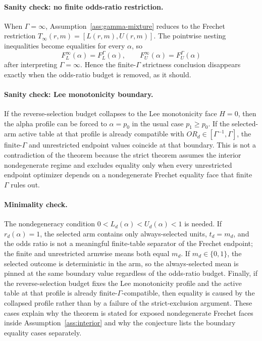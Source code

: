 \paragraph{Sanity check: no finite odds-ratio restriction.}
When \(\Gamma=\infty\), Assumption~\ref{ass:gamma-mixture} reduces to the Frechet restriction \(T_\infty(r,m)=[L(r,m),U(r,m)]\).  The pointwise nesting inequalities become equalities for every \(\alpha\), so
\[
  F_L^\infty(\alpha)=F_L^\Gamma(\alpha),
  \qquad
  F_U^\infty(\alpha)=F_U^\Gamma(\alpha)
\]
after interpreting \(\Gamma=\infty\).  Hence the finite-\(\Gamma\) strictness conclusion disappears exactly when the odds-ratio budget is removed, as it should.

\paragraph{Sanity check: Lee monotonicity boundary.}
If the reverse-selection budget collapses to the Lee monotonicity face \(H=0\), then the alpha profile can be forced to \(\alpha=p_0\) in the usual case \(p_1\ge p_0\).  If the selected-arm active table at that profile is already compatible with \(OR_d\in[\Gamma^{-1},\Gamma]\), the finite-\(\Gamma\) and unrestricted endpoint values coincide at that boundary.  This is not a contradiction of the theorem because the strict theorem assumes the interior nondegenerate regime and excludes equality only when every unrestricted endpoint optimizer depends on a nondegenerate Frechet equality face that finite \(\Gamma\) rules out.

\paragraph{Minimality check.}
The nondegeneracy condition \(0<L_d(\alpha)<U_d(\alpha)<1\) is needed.  If \(r_d(\alpha)=1\), the selected arm contains only always-selected units, \(t_d=m_d\), and the odds ratio is not a meaningful finite-table separator of the Frechet endpoint; the finite and unrestricted armwise means both equal \(m_d\).  If \(m_d\in\{0,1\}\), the selected outcome is deterministic in the arm, so the always-selected mean is pinned at the same boundary value regardless of the odds-ratio budget.  Finally, if the reverse-selection budget fixes the Lee monotonicity profile and the active table at that profile is already finite-\(\Gamma\)-compatible, then equality is caused by the collapsed profile rather than by a failure of the strict-exclusion argument.  These cases explain why the theorem is stated for exposed nondegenerate Frechet faces inside Assumption~\ref{ass:interior} and why the conjecture lists the boundary equality cases separately.
